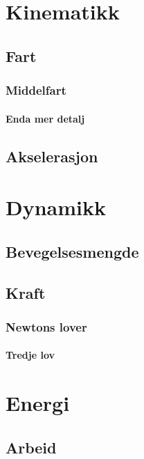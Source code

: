 \documentclass[A4,12pt,twoside]{book}
\begin{document}
\chapter{Kinematikk}
\section{Fart}
\subsection{Middelfart}
\subsubsection{Enda mer detalj}
\section{Akselerasjon}
\chapter{Dynamikk}
\section{Bevegelsesmengde}
\section{Kraft}
\subsection{Newtons lover}
\subsubsection{Tredje lov}
\chapter{Energi}
\section{Arbeid}
\end{document}
